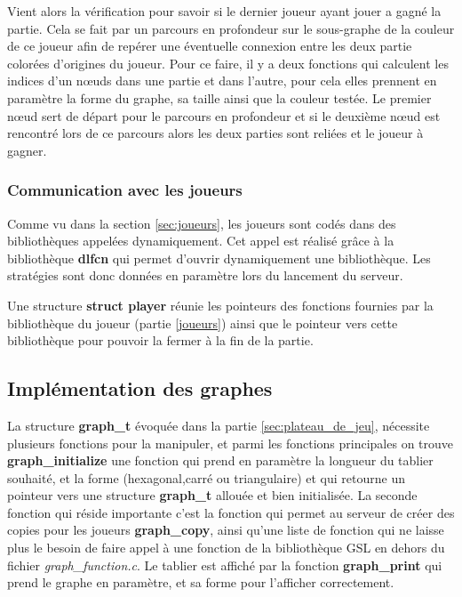 Vient alors la vérification pour savoir si le dernier joueur ayant jouer a gagné la partie. Cela se fait par un parcours en profondeur sur le sous-graphe de la couleur de ce joueur afin de repérer une éventuelle connexion entre les deux partie colorées d'origines du joueur. Pour ce faire, il y a deux fonctions qui calculent les indices d'un nœuds dans une partie et dans l'autre, pour cela elles prennent en paramètre la forme du graphe, sa taille ainsi que la couleur testée. Le premier nœud sert de départ pour le parcours en profondeur et si le deuxième nœud est rencontré lors de ce parcours alors les deux parties sont reliées et le joueur à gagner.

\subsubsection{Communication avec les joueurs}
\label{sec:com_joueurs}

Comme vu dans la section \ref{sec:joueurs}, les joueurs sont codés dans des bibliothèques appelées dynamiquement. Cet appel est réalisé grâce à la bibliothèque \textbf{dlfcn} qui permet d'ouvrir dynamiquement une bibliothèque. Les stratégies sont donc données en paramètre lors du lancement du serveur.

Une structure \textbf{struct player} réunie les pointeurs des fonctions fournies par la bibliothèque du joueur (partie \ref{joueurs}) ainsi que le pointeur vers cette bibliothèque pour pouvoir la fermer à la fin de la partie.

\subsection{Implémentation des graphes}
La structure \textbf{graph\_t} évoquée dans la partie \ref{sec:plateau_de_jeu}, nécessite plusieurs fonctions pour la manipuler, et parmi les fonctions principales on trouve \textbf{graph\_initialize} une fonction qui prend en paramètre la longueur du tablier souhaité, et la forme (hexagonal,carré ou triangulaire) et qui retourne un pointeur vers une structure \textbf{graph\_t} allouée et bien initialisée. La seconde fonction qui réside importante c'est la fonction qui permet au serveur de créer des copies pour les joueurs \textbf{graph\_copy}, ainsi qu'une liste de fonction qui ne laisse plus le besoin de faire appel à une fonction de la bibliothèque GSL en dehors du fichier \textit{graph\_function.c}.
Le tablier est affiché par la fonction \textbf{graph\_print} qui prend le graphe en paramètre, et sa forme pour l'afficher correctement.